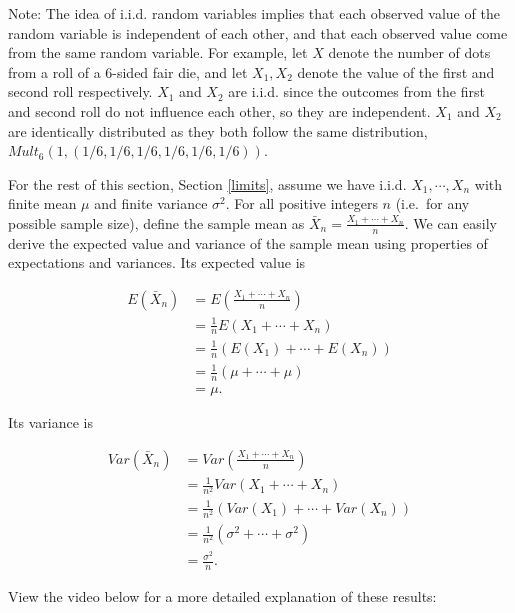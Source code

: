 \documentclass[
]{book}
\begin{document}
Note: The idea of i.i.d. random variables implies that each observed value of the random variable is independent of each other, and that each observed value come from the same random variable. For example, let \(X\) denote the number of dots from a roll of a 6-sided fair die, and let \(X_1, X_2\) denote the value of the first and second roll respectively. \(X_1\) and \(X_2\) are i.i.d. since the outcomes from the first and second roll do not influence each other, so they are independent. \(X_1\) and \(X_2\) are identically distributed as they both follow the same distribution, \(Mult_6(1, (1/6, 1/6, 1/6, 1/6, 1/6, 1/6))\).

For the rest of this section, Section \ref{limits}, assume we have i.i.d. \(X_1, \cdots, X_n\) with finite mean \(\mu\) and finite variance \(\sigma^2\). For all positive integers \(n\) (i.e.~for any possible sample size), define the sample mean as \(\bar{X}_n = \frac{X_1 + \cdots + X_n}{n}\). We can easily derive the expected value and variance of the sample mean using properties of expectations and variances. Its expected value is

\begin{equation} 
\begin{split}
E(\bar{X}_n) &= E(\frac{X_1 + \cdots + X_n}{n}) \\
             &= \frac{1}{n}E(X_1 + \cdots + X_n) \\
             &= \frac{1}{n} (E(X_1) + \cdots + E(X_n)) \\
             &= \frac{1}{n} (\mu + \cdots + \mu) \\
             &= \mu.
\end{split}
\label{eq:6-Emean}
\end{equation}

Its variance is

\begin{equation} 
\begin{split}
Var(\bar{X}_n) &= Var(\frac{X_1 + \cdots + X_n}{n}) \\
             &= \frac{1}{n^2}Var(X_1 + \cdots + X_n) \\
             &= \frac{1}{n^2} (Var(X_1) + \cdots + Var(X_n)) \\
             &= \frac{1}{n^2} (\sigma^2 + \cdots + \sigma^2) \\
             &= \frac{\sigma^2}{n}.
\end{split}
\label{eq:6-Varmean}
\end{equation}

View the video below for a more detailed explanation of these results:
\end{document}
